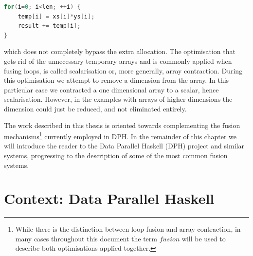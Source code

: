 \documentclass[preamble.tex]{subfiles}
\begin{document}
\begin{lstlisting}[basicstyle={\ttfamily},language=C,tabsize=4]
for(i=0; i<len; ++i) {
	temp[i] = xs[i]*ys[i];
	result += temp[i];
}
\end{lstlisting}


which does not completely bypass the extra allocation. The optimisation that gets rid of the unnecessary temporary arrays and is commonly applied when fusing loops, is called scalarisation or, more generally, array contraction. During this optimisation we attempt to remove a dimension from the array. In this particular case we contracted a one dimensional array to a scalar, hence scalarisation. However, in the examples with arrays of higher dimensions the dimension could just be reduced, and not eliminated entirely.

The work described in this thesis is oriented towards complementing the fusion mechanisms\footnote{While there is the distinction between loop fusion and array contraction, in many cases throughout this document the term $fusion$ will be used to describe both optimisations applied together.} currently employed in DPH. In the remainder of this chapter we will introduce the reader to the Data Parallel Haskell (DPH) project and similar systems, progressing to the description of some of the most common fusion systems.


\clearpage

\section{Context: Data Parallel Haskell}
\label{sec:DPH}
\end{document}
